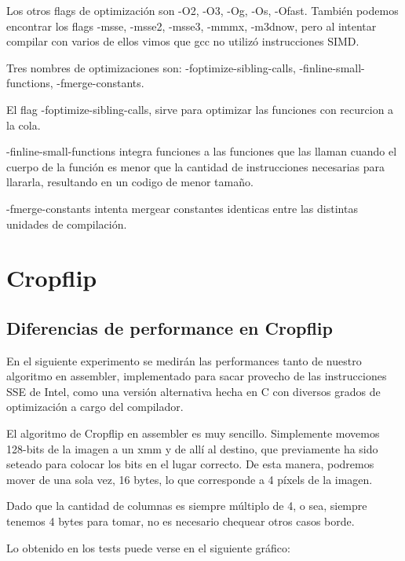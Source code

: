 \documentclass[a4paper]{article}
\begin{document}
Los otros flags de optimización son -O2, -O3, -Og, -Os, -Ofast. También podemos encontrar los flags -msse, -msse2, -msse3, -mmmx, -m3dnow, pero al intentar compilar con varios de ellos vimos que gcc no utilizó instrucciones SIMD.

Tres nombres de optimizaciones son: -foptimize-sibling-calls, -finline-small-functions, -fmerge-constants.

El flag -foptimize-sibling-calls, sirve para optimizar las funciones con recurcion a la cola.

-finline-small-functions integra funciones a las funciones que las llaman cuando el cuerpo de la función es menor que la cantidad de instrucciones necesarias para llararla, resultando en un codigo de menor tamaño.

-fmerge-constants intenta mergear constantes identicas entre las distintas unidades de compilación.

\newpage

\section{Cropflip}

\subsection{Diferencias de performance en Cropflip}
En el siguiente experimento se medirán las performances tanto de nuestro algoritmo en assembler, implementado para sacar provecho de las instrucciones SSE de Intel, como una versión alternativa hecha en C con diversos grados de optimización a cargo del compilador.

El algoritmo de Cropflip en assembler es muy sencillo. Simplemente movemos 128-bits de la imagen a un xmm y de allí al destino, que previamente ha sido seteado para colocar los bits en el lugar correcto. De esta manera, podremos mover de una sola vez, 16 bytes, lo que corresponde a 4 píxels de la imagen.

Dado que la cantidad de columnas es siempre múltiplo de 4, o sea, siempre tenemos 4 bytes para tomar, no es necesario chequear otros casos borde.

Lo obtenido en los tests puede verse en el siguiente gráfico:
\end{document}
